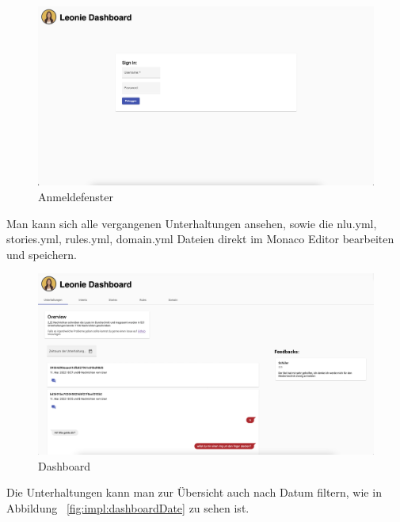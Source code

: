 \begin{figure}[hbt!]
    \centering
    \includegraphics[scale=0.2]{pics/signin}
    \caption{Anmeldefenster}
    \label{fig:impl:signin}
\end{figure}

Man kann sich alle vergangenen Unterhaltungen ansehen, sowie die nlu.yml, stories.yml, rules.yml, domain.yml Dateien direkt im Monaco Editor bearbeiten und speichern.

\begin{figure}[hbt!]
    \centering
    \includegraphics[scale=0.2]{pics/dashboardConvo}
    \caption{Dashboard}
    \label{fig:impl:dashConv}
\end{figure}

Die Unterhaltungen kann man zur Übersicht auch nach Datum filtern, wie in Abbildung ~\ref{fig:impl:dashboardDate} zu sehen ist.

